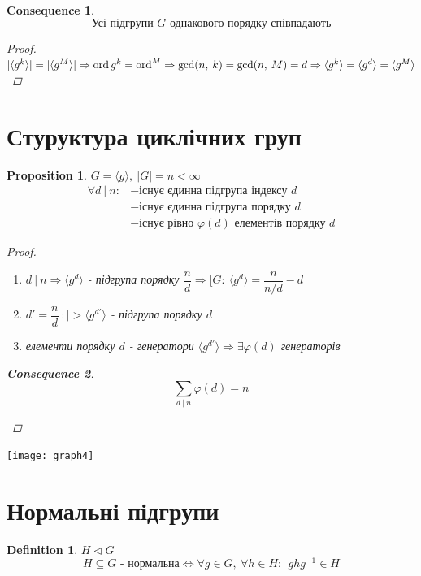 \documentclass[a4paper,12pt, centered]{bookest}
\newtheorem{definition}{Definition}[section]
\newtheorem*{prop*}{Proposition}
\newtheorem*{cons*}{Consequence}
\DeclareMathOperator{\ord}{ord}
\begin{document}
\begin{cons*}
	$$\textrm{Усі підгрупи }G\textrm{ однакового порядку співпадають}$$
	\begin{proof}
		$|\langle g^k\rangle|=|\langle g^M\rangle|\Rightarrow\ord g^k=\ord^M\Rightarrow\gcd(n,\>k)=\gcd(n,\>M)=d\\\Rightarrow\langle g^k\rangle=\langle g^d\rangle=\langle g^M\rangle$
	\end{proof}
\end{cons*}
\section{Стуруктура циклічних груп}
\begin{prop*}$G=\langle g\rangle,\>|G|=n<\infty$
	\begin{align*}
		\forall d\>|\>n:&-\textrm{існує єдинна підгрупа індексу } d\\
		&-\textrm{існує єдинна підгрупа порядку } d\\
		&-\textrm{існує рівно }\varphi(d) \textrm{ елементів порядку } d
	\end{align*}
	\begin{proof}$ $
		\begin{enumerate}
			\item $d\>|\>n\Rightarrow\langle g^d\rangle$ - підгрупа порядку $\dfrac nd\Rightarrow[G:\>\langle g^d\rangle=\dfrac n{n/d}-d$
			\item $d'=\dfrac nd\>:|>\langle g^{d'}\rangle$ - підгрупа порядку $d$
			\item елементи порядку $d$ - генератори $\langle g^{d'}\rangle\Rightarrow\exists\varphi(d)$ генераторів
		\end{enumerate}
		\begin{cons*}
			$$\sum\limits_{d\>|\>n}\varphi(d)=n$$
		\end{cons*}
	\end{proof}
\end{prop*}
\begin{center}
	\texttt{[image: graph4]}
\end{center}\newpage
\section{Нормальні підгрупи}
\begin{definition}$H\triangleleft G$
	$$H\subseteq G\textrm{ - нормальна}\Leftrightarrow\forall g\in G,\>\forall h\in H:\>\>ghg^{-1}\in H$$
\end{definition}
\end{document}
